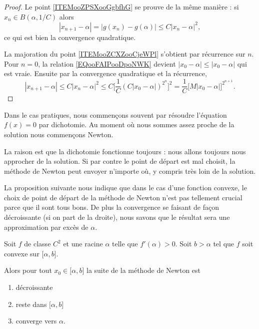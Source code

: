 \begin{proof}
    Le point \ref{ITEMooZPSXooGgbfhG} se prouve de la même manière : si \( x_n\in B(\alpha,1/C)\) alors
    \begin{equation}
        | x_{n+1}-\alpha |=| g(x_n)-g(\alpha) |\leq C| x_n-\alpha |^2,
    \end{equation}
    ce qui est bien la convergence quadratique.

    La majoration du point \ref{ITEMooZCXZooCjeWPl} s'obtient par récurrence sur \( n\). Pour \( n=0\), la relation \eqref{EQooFAIPooDpoNWK} devient \( | x_0-\alpha |\leq | x_0-\alpha |\) qui est vraie. Ensuite par la convergence quadratique et la récurrence,
    \begin{equation}
        | x_{n+1}-\alpha |\leq C| x_n-\alpha |^2\leq C\big[  \frac{1}{ C }(C| x_0-\alpha |)^{2^n}  \big]^2=\frac{1}{ C }\big[ M| x_0-\alpha | \big]^{2^{n+1}}.
    \end{equation}
\end{proof}

\begin{normaltext}
    Dans le cas pratiques, nous commençons souvent par résoudre l'équation \( f(x)=0\) par dichotomie. Au moment où nous sommes assez proche de la solution nous commençons Newton.

    La raison est que la dichotomie fonctionne toujours : nous allons toujours nous approcher de la solution. Si par contre le point de départ est mal choisit, la méthode de Newton peut envoyer n'importe où, y compris très loin de la solution.
\end{normaltext}

La proposition suivante nous indique que dans le cas d'une fonction convexe, le choix de point de départ de la méthode de Newton n'est pas tellement crucial parce que il sont tous bons. De plus la convergence se faisant de façon décroissante (si on part de la droite), nous savons que le résultat sera une approximation par excès de \( \alpha\).
\begin{proposition}     \label{PROPooVTSAooAtSLeI}
    Soit \( f\) de classe \( C^2\) et une racine \( \alpha\) telle que \( f'(\alpha)>0\). Soit \( b>\alpha \) tel que \( f\) soit convexe sur \( \mathopen[ \alpha , b \mathclose]\).

    Alors pour tout \( x_0\in\mathopen[ \alpha , b \mathclose]\) la suite de la méthode de Newton est
    \begin{enumerate}
        \item
            décroissante
        \item
            reste dans \( \mathopen[ \alpha , b \mathclose]\)
        \item
            converge vers \( \alpha\).
    \end{enumerate}
\end{proposition}

